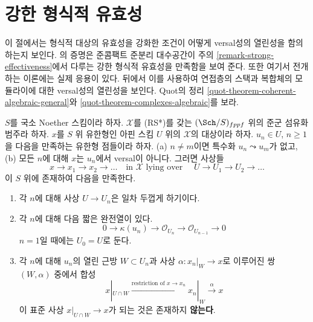 \section{강한 형식적 유효성}
\label{section-strong-formal-effectiveness}

\noindent
이 절에서는 형식적 대상의 유효성을 강화한 조건이 어떻게 versal성의
열린성을 함의하는지 보인다. \cite[Theorem 1.1]{Bhatt-Algebraize}의
증명은 준콤팩트 준분리 대수공간이 주의
\ref{remark-strong-effectiveness}에서 다루는 강한 형식적 유효성을
만족함을 보여 준다. 또한 여기서 전개하는 이론에는 실제 응용이 있다.
뒤에서 이를 사용하여 연접층의 스택과 복합체의 모듈라이에 대한
versal성의 열린성을 보인다. Quot의 정리
\ref{quot-theorem-coherent-algebraic-general}와
\ref{quot-theorem-complexes-algebraic}를 보라.

\begin{lemma}
\label{lemma-infinite-sequence-pre}
$S$를 국소 Noether 스킴이라 하자. $\mathcal{X}$를 (RS*)를 갖는
$(\Sch/S)_{fppf}$ 위의 준군 섬유화 범주라 하자.
$x$를 $S$ 위 유한형인 아핀 스킴 $U$ 위의 $\mathcal{X}$의 대상이라 하자.
$u_n \in U$, $n \geq 1$을 다음을 만족하는 유한형 점들이라 하자.
(a) $n \not = m$이면 특수화 $u_n \leadsto u_m$가 없고,
(b) 모든 $n$에 대해 $x$는 $u_n$에서 versal이 아니다. 그러면 사상들
$$
x \to x_1 \to x_2 \to \ldots
\quad\text{in }\mathcal{X}\text{ lying over }\quad
U \to U_1 \to U_2 \to \ldots
$$
이 $S$ 위에 존재하여 다음을 만족한다.
\begin{enumerate}
\item 각 $n$에 대해 사상 $U \to U_n$은 일차 두껍게 하기이다.
\item 각 $n$에 대해 다음 짧은 완전열이 있다.
$$
0 \to \kappa(u_n) \to \mathcal{O}_{U_n} \to \mathcal{O}_{U_{n - 1}} \to 0
$$
$n = 1$일 때에는 $U_0 = U$로 둔다.
\item 각 $n$에 대해 $u_n$의 열린 근방 $W \subset U_n$과
사상 $\alpha : x_n|_W \to x$로 이루어진 쌍 $(W, \alpha)$ 중에서 합성
$$
x|_{U \cap W} \xrightarrow{\text{restriction of }x \to x_n}
x_n|_W \xrightarrow{\alpha} x
$$
이 표준 사상 $x|_{U \cap W} \to x$가 되는 것은 존재하지 {\bf 않는다}.
\end{enumerate}
\end{lemma}

